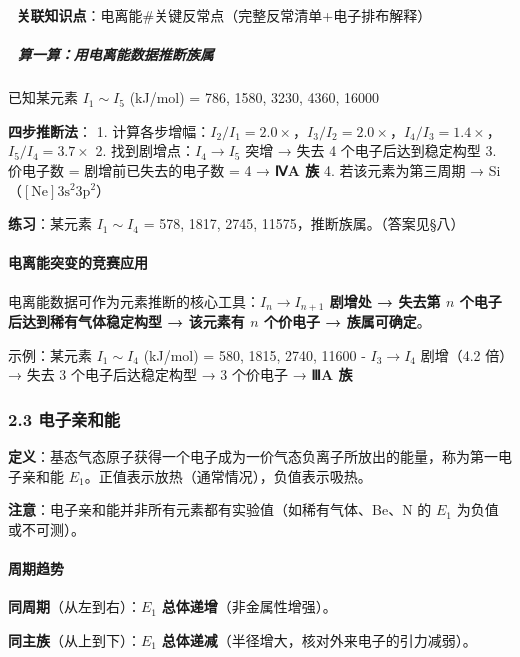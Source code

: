 \documentclass[a4paper,11pt]{ctexart}
\begin{document}
🔗 \textbf{关联知识点}：电离能\#关键反常点（完整反常清单+电子排布解释）

\subparagraph{📝 算一算：用电离能数据推断族属}\label{ux7b97ux4e00ux7b97ux7528ux7535ux79bbux80fdux6570ux636eux63a8ux65adux65cfux5c5e}

已知某元素 \(I_1\sim I_5\) (kJ/mol) = 786, 1580, 3230, 4360, 16000

\textbf{四步推断法}：
1. 计算各步增幅：\(I_2/I_1=2.0\times\)，\(I_3/I_2=2.0\times\)，\(I_4/I_3=1.4\times\)，\(I_5/I_4=3.7\times\)
2. 找到剧增点：\(I_4\to I_5\) 突增 → 失去 4 个电子后达到稳定构型
3. 价电子数 = 剧增前已失去的电子数 = 4 → \textbf{ⅣA 族}
4. 若该元素为第三周期 → Si（\([\mathrm{Ne}]3\mathrm{s}^2 3\mathrm{p}^2\)）

\textbf{练习}：某元素 \(I_1\sim I_4\) = 578, 1817, 2745, 11575，推断族属。（答案见§八）

\paragraph{电离能突变的竞赛应用}\label{ux7535ux79bbux80fdux7a81ux53d8ux7684ux7adeux8d5bux5e94ux7528}

电离能数据可作为元素推断的核心工具：\textbf{\(I_n \to I_{n+1}\) 剧增处 → 失去第 \(n\) 个电子后达到稀有气体稳定构型 → 该元素有 \(n\) 个价电子 → 族属可确定}。

示例：某元素 \(I_1\sim I_4\) (kJ/mol) = 580, 1815, 2740, 11600
- \(I_3\to I_4\) 剧增（4.2 倍）→ 失去 3 个电子后达稳定构型 → 3 个价电子 → \textbf{ⅢA 族}

\subsubsection{2.3 电子亲和能}\label{ux7535ux5b50ux4eb2ux548cux80fd}

\textbf{定义}：基态气态原子获得一个电子成为一价气态负离子所放出的能量，称为第一电子亲和能 \(E_1\)。正值表示放热（通常情况），负值表示吸热。

\textbf{注意}：电子亲和能并非所有元素都有实验值（如稀有气体、Be、N 的 \(E_1\) 为负值或不可测）。

\paragraph{周期趋势}\label{ux5468ux671fux8d8bux52bf-1}

\textbf{同周期}（从左到右）：\(E_1\) \textbf{总体递增}（非金属性增强）。

\textbf{同主族}（从上到下）：\(E_1\) \textbf{总体递减}（半径增大，核对外来电子的引力减弱）。
\end{document}
